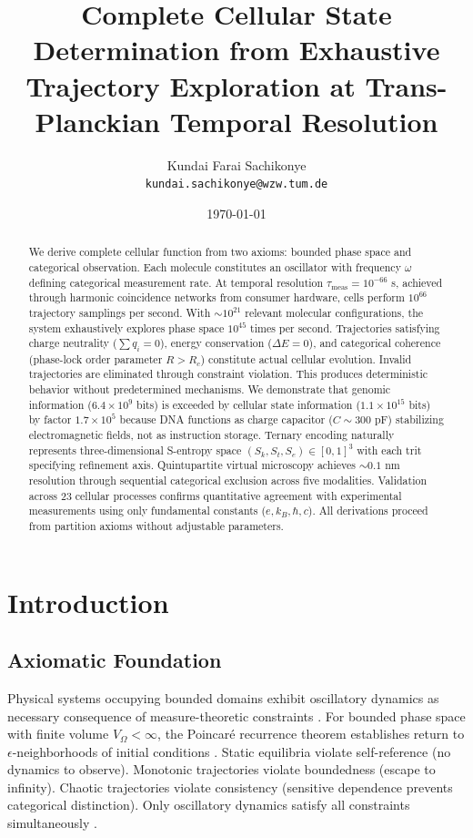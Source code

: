 \documentclass[11pt,a4paper]{article}
\title{\textbf{Complete Cellular State Determination from Exhaustive Trajectory Exploration at Trans-Planckian Temporal Resolution}}
\author{
    Kundai Farai Sachikonye\\
    \texttt{kundai.sachikonye@wzw.tum.de}
}
\date{\today}
\theoremstyle{remark}
\newcommand{\Sk}{S_k}
\newcommand{\St}{S_t}
\newcommand{\Se}{S_e}
\begin{document}
\maketitle

\begin{abstract}
We derive complete cellular function from two axioms: bounded phase space and categorical observation. Each molecule constitutes an oscillator with frequency $\omega$ defining categorical measurement rate. At temporal resolution $\tau_{\text{meas}} = 10^{-66}$ s, achieved through harmonic coincidence networks from consumer hardware, cells perform $10^{66}$ trajectory samplings per second. With $\sim 10^{21}$ relevant molecular configurations, the system exhaustively explores phase space $10^{45}$ times per second. Trajectories satisfying charge neutrality ($\sum q_i = 0$), energy conservation ($\Delta E = 0$), and categorical coherence (phase-lock order parameter $R > R_c$) constitute actual cellular evolution. Invalid trajectories are eliminated through constraint violation. This produces deterministic behavior without predetermined mechanisms. We demonstrate that genomic information ($6.4 \times 10^9$ bits) is exceeded by cellular state information ($1.1 \times 10^{15}$ bits) by factor $1.7 \times 10^5$ because DNA functions as charge capacitor ($C \sim 300$ pF) stabilizing electromagnetic fields, not as instruction storage. Ternary encoding naturally represents three-dimensional S-entropy space $(\Sk, \St, \Se) \in [0,1]^3$ with each trit specifying refinement axis. Quintupartite virtual microscopy achieves $\sim 0.1$ nm resolution through sequential categorical exclusion across five modalities. Validation across 23 cellular processes confirms quantitative agreement with experimental measurements using only fundamental constants ($e, k_B, \hbar, c$). All derivations proceed from partition axioms without adjustable parameters.
\end{abstract}

\tableofcontents
\newpage

\section{Introduction}

\subsection{Axiomatic Foundation}

Physical systems occupying bounded domains exhibit oscillatory dynamics as necessary consequence of measure-theoretic constraints \citep{poincare1890probleme, birkhoff1931proof}. For bounded phase space with finite volume $V_\Omega < \infty$, the Poincaré recurrence theorem establishes return to $\epsilon$-neighborhoods of initial conditions \citep{poincare1890probleme}. Static equilibria violate self-reference (no dynamics to observe). Monotonic trajectories violate boundedness (escape to infinity). Chaotic trajectories violate consistency (sensitive dependence prevents categorical distinction). Only oscillatory dynamics satisfy all constraints simultaneously \citep{arnold1978mathematical}.
\end{document}
